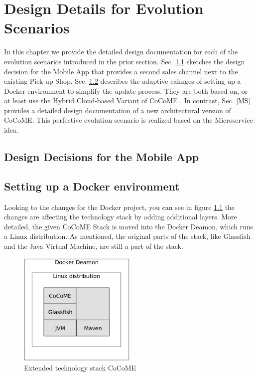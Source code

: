 \chapter{Design Details for Evolution Scenarios}
In this chapter we provide the detailed design documentation for each of the evolution scenarios
introduced in the prior section. Sec. \ref{App} sketches the design decision for the Mobile App that provides a second sales channel next to the existing Pick-up Shop. Sec. \ref{Docker} describes the adaptive cahnges of setting up a Docker environment to simplify the update process. They are both based on, or at least use the Hybrid Cloud-based Variant of CoCoME \cite{SWB-469002735}. In contrast, Sec. \ref{MS} provides a detailed design documentation of a new architectural version of CoCoME. This perfective evolution scenario is realized based on the Microservice idea.

\section{Design Decisions for the Mobile App} \label{App}


\section{Setting up a Docker environment} \label{Docker}
	Looking to the changes for the Docker project, you can see in figure \ref*{techStack} the changes are affecting the technology stack by adding additional layers. More detailed, the given CoCoME Stack is moved into the Docker Deamon, which runs a Linux distribution. As mentioned, the original parts of the stack, like Glassfish and the Java Virtual Machine, are still a part of the stack.\\
	\begin{figure}[H]
		\centering
		\includegraphics[width = 0.5\textwidth]{img/tech_stack_CoCoME.png}
		\caption{Extended technology stack CoCoME}
		\label{techStack}
	\end{figure}
	
